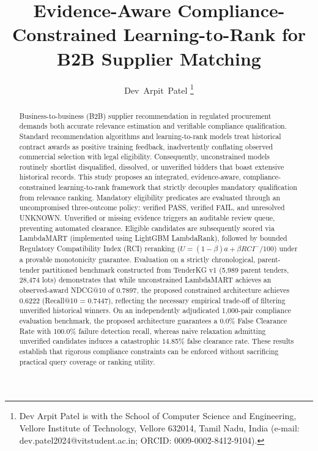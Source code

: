 \documentclass[journal,10pt,onecolumn,draftclsnofoot]{IEEEtran}
\begin{document}
\title{Evidence-Aware Compliance-Constrained Learning-to-Rank for B2B Supplier Matching}

\author{Dev~Arpit~Patel%
\thanks{Dev Arpit Patel is with the School of Computer Science and Engineering, Vellore Institute of Technology, Vellore 632014, Tamil Nadu, India (e-mail: dev.patel2024@vitstudent.ac.in; ORCID: 0009-0002-8412-9104).}}

\maketitle

\begin{abstract}
Business-to-business (B2B) supplier recommendation in regulated procurement demands both accurate relevance estimation and verifiable compliance qualification. Standard recommendation algorithms and learning-to-rank models treat historical contract awards as positive training feedback, inadvertently conflating observed commercial selection with legal eligibility. Consequently, unconstrained models routinely shortlist disqualified, dissolved, or unverified bidders that boast extensive historical records. This study proposes an integrated, evidence-aware, compliance-constrained learning-to-rank framework that strictly decouples mandatory qualification from relevance ranking. Mandatory eligibility predicates are evaluated through an uncompromised three-outcome policy: verified PASS, verified FAIL, and unresolved UNKNOWN. Unverified or missing evidence triggers an auditable review queue, preventing automated clearance. Eligible candidates are subsequently scored via LambdaMART (implemented using LightGBM LambdaRank), followed by bounded Regulatory Compatibility Index (RCI) reranking ($U = (1-\beta)a + \beta RCI^-/100$) under a provable monotonicity guarantee. Evaluation on a strictly chronological, parent-tender partitioned benchmark constructed from TenderKG v1 (5,989 parent tenders, 28,474 lots) demonstrates that while unconstrained LambdaMART achieves an observed-award NDCG@10 of 0.7897, the proposed constrained architecture achieves 0.6222 (Recall@10 = 0.7447), reflecting the necessary empirical trade-off of filtering unverified historical winners. On an independently adjudicated 1,000-pair compliance evaluation benchmark, the proposed architecture guarantees a 0.0\% False Clearance Rate with 100.0\% failure detection recall, whereas naive relaxation admitting unverified candidates induces a catastrophic 14.85\% false clearance rate. These results establish that rigorous compliance constraints can be enforced without sacrificing practical query coverage or ranking utility.
\end{abstract}
\end{document}
